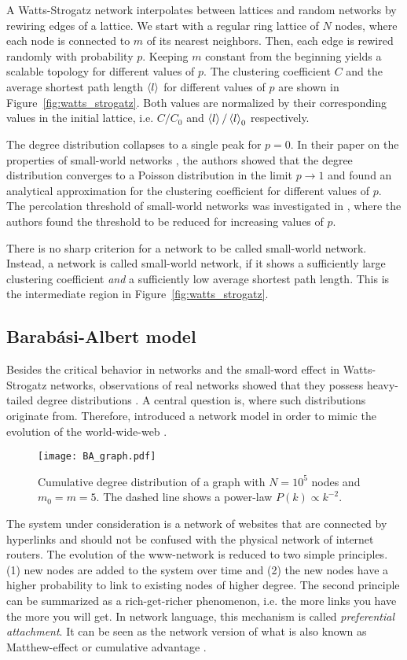 A Watts-Strogatz network interpolates between lattices and random networks by rewiring edges of a lattice.
We start with a regular ring lattice of $N$ nodes, where each node is connected to $m$ of its nearest neighbors.
Then, each edge is rewired randomly with probability $p$.
Keeping $m$ constant from the beginning yields a scalable topology for different values of $p$.
The clustering coefficient $C$ and the average shortest path length $\left< l \right>$ for different values of $p$ are shown in Figure~\ref{fig:watts_strogatz}.
Both values are normalized by their corresponding values in the initial lattice, i.e. $C/C_0$ and $\left< l \right>/\left< l \right>_0$ respectively.

The degree distribution collapses to a single peak for $p=0$.
In their paper on the properties of small-world networks \citep{Barrat:2000fj}, the authors showed that the degree distribution converges to a Poisson distribution in the limit $p\rightarrow 1$ and found an analytical approximation for the clustering coefficient for different values of $p$.
The percolation threshold of small-world networks was investigated in \citep{Ball:1997tq,Sander2002293}, where the authors found the threshold to be reduced for increasing values of $p$.

There is no sharp criterion for a network to be called small-world network.
Instead, a network is called small-world network, if it shows a sufficiently large clustering coefficient \emph{and} a sufficiently low average shortest path length.
This is the intermediate region in Figure~\ref{fig:watts_strogatz}. 

\subsection{Barab\'asi-Albert model}\label{sec:BA_model}
Besides the critical behavior in \ER networks and the small-word effect in Watts-Strogatz networks, observations of real networks showed that they possess heavy-tailed degree distributions \citep{Barabasi99,Liljeros:2001p841}.
A central question is, where such distributions originate from.
Therefore, \citeauthor{Barabasi99} introduced a network model in order to mimic the evolution of the world-wide-web \citep{Barabasi99}.
%
\begin{SCfigure}
\texttt{[image: BA\_graph.pdf]}
\caption{Cumulative degree distribution of a \BA graph with $N=10^5$ nodes and $m_0=m=5$.
The dashed line shows a power-law $P(k)\propto k^{-2}$.}
\label{fig:BA_cdf}
\end{SCfigure}
%
The system under consideration is a network of websites that are connected by hyperlinks and should not be confused with the physical network of internet routers.
The evolution of the www-network is reduced to two simple principles.
(1) new nodes are added to the system over time and (2) the new nodes have a higher probability to link to existing nodes of higher degree.
The second principle can be summarized as a rich-get-richer phenomenon, i.e. the more links you have the more you will get.
In network language, this mechanism is called \emph{preferential attachment}.
It can be seen as the network version of what is also known as Matthew-effect or cumulative advantage \citep{Merton:1968fh,price:1976}.

